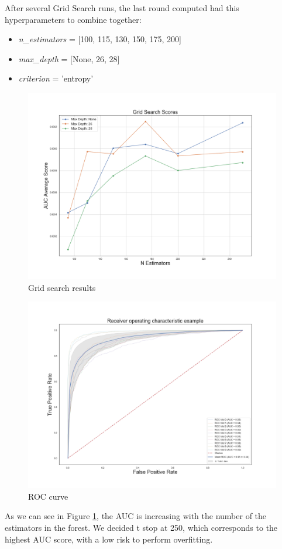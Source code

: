 After several Grid Search runs, the last round computed had this hyperparameters to combine together:
\begin{itemize}
	\item[\PencilRight] \textit{n\_estimators} = [100, 115, 130, 150, 175, 200]
	\item[\PencilRight]\textit{max\_depth} = [None, 26, 28]
	\item[\PencilRight]\textit{criterion} = 'entropy'
\end{itemize}
\begin{figure}[htp!]
	\centering
	\includegraphics[width=\columnwidth]{chapter5/figure/gridSearch.png}
	\caption{Grid search results}
	\label{fig:grid_search}
\end{figure}
\begin{figure}[htp!]
	\centering
	\includegraphics[width=\columnwidth]{chapter5/figure/auc.png}
	\caption{ROC curve}
	\label{fig:auc}
\end{figure}
As we can see in Figure \ref{fig:grid_search}, the AUC is increasing with the number of the estimators in the forest. We decided t stop at 250, which corresponds to the highest AUC score, with a low risk to perform overfitting.


